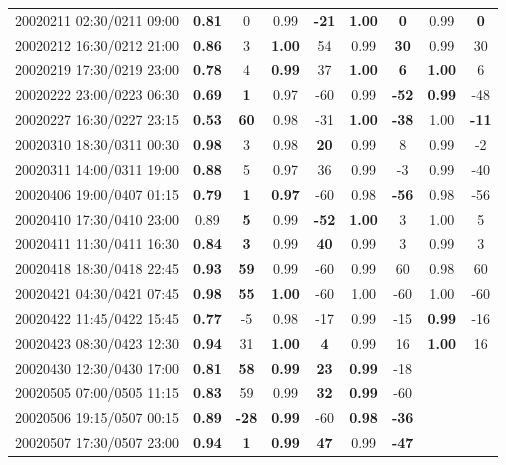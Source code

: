 \documentclass[linenumbers,draft]{agujournal}
\begin{document}
\begin{center}
\begin{longtable}{c||cc|cc|cc|cc}
20020211 02:30/0211 09:00 & \textbf{0.81} & 0 & 0.99 & \textbf{-21} & \textbf{1.00} & \textbf{0} & 0.99 & \textbf{0} \\
20020212 16:30/0212 21:00 & \textbf{0.86} & 3 & \textbf{1.00} & 54 & 0.99 & \textbf{30} & 0.99 & 30 \\
20020219 17:30/0219 23:00 & \textbf{0.78} & 4 & \textbf{0.99} & 37 & \textbf{1.00} & \textbf{6} & \textbf{1.00} & 6 \\
20020222 23:00/0223 06:30 & \textbf{0.69} & \textbf{1} & 0.97 & -60 & 0.99 & \textbf{-52} & \textbf{0.99} & -48 \\
20020227 16:30/0227 23:15 & \textbf{0.53} & \textbf{60} & 0.98 & -31 & \textbf{1.00} & \textbf{-38} & 1.00 & \textbf{-11} \\
20020310 18:30/0311 00:30 & \textbf{0.98} & 3 & 0.98 & \textbf{20} & 0.99 & 8 & 0.99 & -2 \\
20020311 14:00/0311 19:00 & \textbf{0.88} & 5 & 0.97 & 36 & 0.99 & -3 & 0.99 & -40 \\
20020406 19:00/0407 01:15 & \textbf{0.79} & \textbf{1} & \textbf{0.97} & -60 & 0.98 & \textbf{-56} & 0.98 & -56 \\
20020410 17:30/0410 23:00 & 0.89 & \textbf{5} & 0.99 & \textbf{-52} & \textbf{1.00} & 3 & 1.00 & 5 \\
20020411 11:30/0411 16:30 & \textbf{0.84} & \textbf{3} & 0.99 & \textbf{40} & 0.99 & 3 & 0.99 & 3 \\
20020418 18:30/0418 22:45 & \textbf{0.93} & \textbf{59} & 0.99 & -60 & 0.99 & 60 & 0.98 & 60 \\
20020421 04:30/0421 07:45 & \textbf{0.98} & \textbf{55} & \textbf{1.00} & -60 & 1.00 & -60 & 1.00 & -60 \\
20020422 11:45/0422 15:45 & \textbf{0.77} & -5 & 0.98 & -17 & 0.99 & -15 & \textbf{0.99} & -16 \\
20020423 08:30/0423 12:30 & \textbf{0.94} & 31 & \textbf{1.00} & \textbf{4} & 0.99 & 16 & \textbf{1.00} & 16 \\
20020430 12:30/0430 17:00 & \textbf{0.81} & \textbf{58} & \textbf{0.99} & \textbf{23} & \textbf{0.99} & -18 &  &  \\
20020505 07:00/0505 11:15 & \textbf{0.83} & 59 & 0.99 & \textbf{32} & \textbf{0.99} & -60 &  &  \\
20020506 19:15/0507 00:15 & \textbf{0.89} & \textbf{-28} & \textbf{0.99} & -60 & \textbf{0.98} & \textbf{-36} &  &  \\
20020507 17:30/0507 23:00 & \textbf{0.94} & \textbf{1} & \textbf{0.99} & \textbf{47} & 0.99 & \textbf{-47} &  &  \\

\end{longtable}
\end{center}
\end{document}
